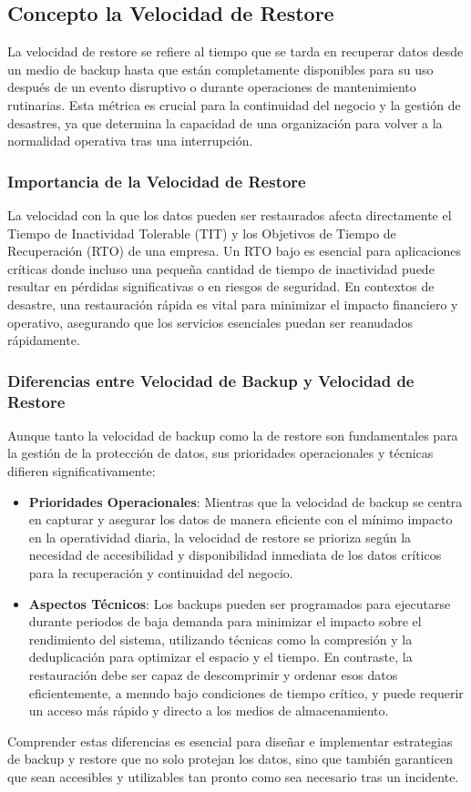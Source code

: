 \subsection{Concepto la Velocidad de Restore}

La velocidad de restore se refiere al tiempo que se tarda en recuperar datos desde un medio de backup hasta que están completamente disponibles para su uso después de un evento disruptivo o durante operaciones de mantenimiento rutinarias. Esta métrica es crucial para la continuidad del negocio y la gestión de desastres, ya que determina la capacidad de una organización para volver a la normalidad operativa tras una interrupción.

\subsubsection{Importancia de la Velocidad de Restore}

La velocidad con la que los datos pueden ser restaurados afecta directamente el Tiempo de Inactividad Tolerable (TIT) y los Objetivos de Tiempo de Recuperación (RTO) de una empresa. Un RTO bajo es esencial para aplicaciones críticas donde incluso una pequeña cantidad de tiempo de inactividad puede resultar en pérdidas significativas o en riesgos de seguridad. En contextos de desastre, una restauración rápida es vital para minimizar el impacto financiero y operativo, asegurando que los servicios esenciales puedan ser reanudados rápidamente.

\subsubsection{Diferencias entre Velocidad de Backup y Velocidad de Restore}

Aunque tanto la velocidad de backup como la de restore son fundamentales para la gestión de la protección de datos, sus prioridades operacionales y técnicas difieren significativamente:

\begin{itemize}
    \item \textbf{Prioridades Operacionales}: Mientras que la velocidad de backup se centra en capturar y asegurar los datos de manera eficiente con el mínimo impacto en la operatividad diaria, la velocidad de restore se prioriza según la necesidad de accesibilidad y disponibilidad inmediata de los datos críticos para la recuperación y continuidad del negocio.
    \item \textbf{Aspectos Técnicos}: Los backups pueden ser programados para ejecutarse durante periodos de baja demanda para minimizar el impacto sobre el rendimiento del sistema, utilizando técnicas como la compresión y la deduplicación para optimizar el espacio y el tiempo. En contraste, la restauración debe ser capaz de descomprimir y ordenar esos datos eficientemente, a menudo bajo condiciones de tiempo crítico, y puede requerir un acceso más rápido y directo a los medios de almacenamiento.
\end{itemize}

Comprender estas diferencias es esencial para diseñar e implementar estrategias de backup y restore que no solo protejan los datos, sino que también garanticen que sean accesibles y utilizables tan pronto como sea necesario tras un incidente.
